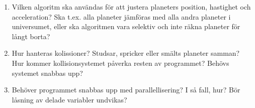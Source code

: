 \begin{enumerate}
    \item Vilken algoritm ska användas för att justera planeters
        position, hastighet och acceleration?
        Ska t.ex. alla planeter jämföras med
        alla andra planeter i universumet,
        eller ska algoritmen vara selektiv och
        inte räkna planeter för långt borta?
    \item Hur hanteras kolissioner?
        Studsar, spricker eller smälts planeter samman?
        Hur kommer kollisionsystemet påverka resten av programmet?
        Behövs systemet snabbas upp?
    \item Behöver programmet snabbas upp med parallellisering?
        I så fall, hur? Bör låsning av delade variabler undvikas?
\end{enumerate}
